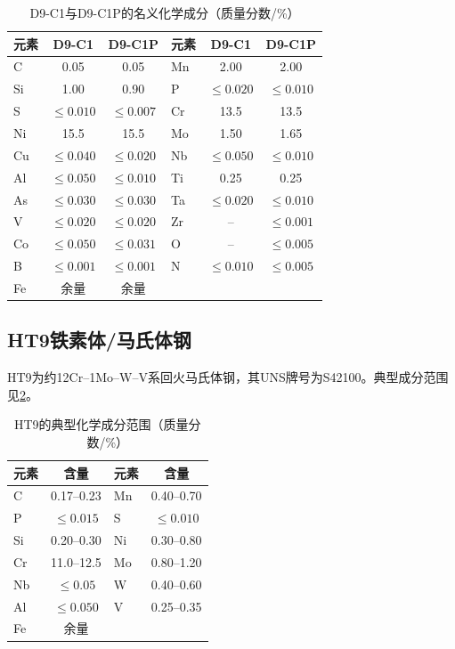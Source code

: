 \begin{table}[htbp]
	\centering
	\caption{D9-C1与D9-C1P的名义化学成分（质量分数/\%）}
	\label{tab:appendix_d9_composition}
	
	\begin{tabular*}{\textwidth}{
			@{\extracolsep{\fill}}
			lcc lcc
			@{}
		}
		\toprule
		元素 & D9-C1 & D9-C1P & 元素 & D9-C1 & D9-C1P \\
		\midrule
		C  & 0.05 & 0.05 & Mn & 2.00 & 2.00 \\
		Si & 1.00 & 0.90 & P  & $\leq0.020$ & $\leq0.010$ \\
		S  & $\leq0.010$ & $\leq0.007$ & Cr & 13.5 & 13.5 \\
		Ni & 15.5 & 15.5 & Mo & 1.50 & 1.65 \\
		Cu & $\leq0.040$ & $\leq0.020$ & Nb & $\leq0.050$ & $\leq0.010$ \\
		Al & $\leq0.050$ & $\leq0.010$ & Ti & 0.25 & 0.25 \\
		As & $\leq0.030$ & $\leq0.030$ & Ta & $\leq0.020$ & $\leq0.010$ \\
		V  & $\leq0.020$ & $\leq0.020$ & Zr & -- & $\leq0.001$ \\
		Co & $\leq0.050$ & $\leq0.031$ & O  & -- & $\leq0.005$ \\
		B  & $\leq0.001$ & $\leq0.001$ & N  & $\leq0.010$ & $\leq0.005$ \\
		Fe & 余量 & 余量 & & & \\
		\bottomrule
	\end{tabular*}
\end{table}

\subsection{HT9铁素体/马氏体钢}

HT9为约12Cr--1Mo--W--V系回火马氏体钢，其UNS牌号为S42100。典型成分范围见\tablename\ref{tab:appendix_ht9_composition}\cite{hofmanMetallicFuelsHandbook2019}。

\begin{table}[htbp]
	\centering
	\caption{HT9的典型化学成分范围（质量分数/\%）}
	\label{tab:appendix_ht9_composition}
	
	\begin{tabular*}{\textwidth}{
			@{\extracolsep{\fill}}
			lc
			@{\hspace{1.2cm}}
			lc
			@{}
		}
		\toprule
		元素 & 含量 & 元素 & 含量 \\
		\midrule
		C  & 0.17--0.23 & Mn & 0.40--0.70 \\
		P  & $\leq0.015$ & S  & $\leq0.010$ \\
		Si & 0.20--0.30 & Ni & 0.30--0.80 \\
		Cr & 11.0--12.5 & Mo & 0.80--1.20 \\
		Nb & $\leq0.05$ & W  & 0.40--0.60 \\
		Al & $\leq0.050$ & V  & 0.25--0.35 \\
		Fe & 余量 & & \\
		\bottomrule
	\end{tabular*}
\end{table}

